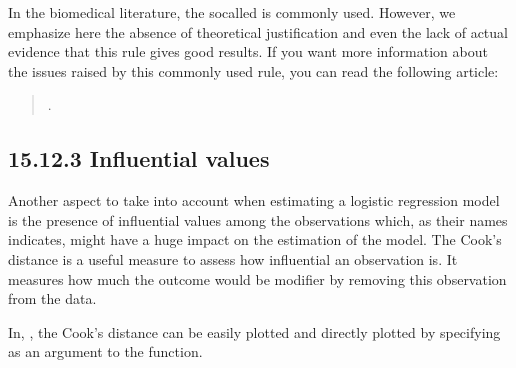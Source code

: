 \documentclass[letterpaper,10pt,english]{jupyterBook}
\begin{document}
\sphinxAtStartPar
In the biomedical literature, the so\sphinxhyphen{}called  is commonly used. However, we emphasize here the absence of theoretical justification and even the lack of actual evidence that this rule gives good results. If you want more information about the issues raised by this commonly used rule, you can read the following article:
\begin{quote}

\sphinxAtStartPar
{}.
\end{quote}


\subsection{15.12.3 Influential values}
\label{\detokenize{15.k. Logistic Regression:influential-values}}
\sphinxAtStartPar
Another aspect to take into account when estimating a logistic regression model is the presence of influential values among the observations which, as their names indicates, might have a huge impact on the estimation of the model. The Cook’s distance is a useful measure to assess how influential an observation is. It measures how much the outcome would be modifier by removing this observation from the data.

\sphinxAtStartPar
In, , the Cook’s distance can be easily plotted and directly plotted by specifying  as an argument to the  function.

\begin{sphinxVerbatim}[commandchars=\\\{\}]
  
              
 
   
\end{sphinxVerbatim}
\end{document}
